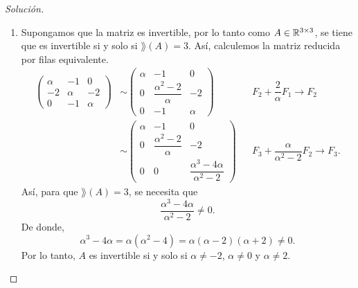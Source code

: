 \documentclass[a4,11pt]{aleph-notas}
\begin{document}
\begin{proof}[Solución]\hspace{0pt}
    \begin{enumerate}
        \item Supongamos que la matriz es invertible, por lo tanto como $A\in\mathbb{R}^{3\times 3}$, se tiene que es invertible si y solo si $\rang(A)=3$. Así, calculemos la matriz reducida por filas equivalente.
        \begin{align*}
            \begin{pmatrix}
                \alpha & -1 & 0 \\
                -2 & \alpha & -2 \\
                0 & -1 & \alpha
            \end{pmatrix}
         & \sim \begin{pmatrix}
                \alpha & -1 & 0 \\
                0 & \dfrac{\alpha^2-2}{\alpha} & -2 \\
                0 & -1 & \alpha 
            \end{pmatrix} && F_2 + \dfrac{2}{\alpha} F_1 \rightarrow F_2 \\
        &\sim \begin{pmatrix}
                \alpha & -1 & 0 \\
                0 & \dfrac{\alpha^2-2}{\alpha} & -2 \\
                0 & 0 & \dfrac{\alpha^3-4\alpha}{\alpha^2-2}
            \end{pmatrix} && F_3 + \dfrac{\alpha}{\alpha^2-2} F_2 \rightarrow F_3.
        \end{align*}
        Así, para que $\rang(A)=3$, se necesita que 
        \[
            \dfrac{\alpha^3-4\alpha}{\alpha^2-2} \neq 0.
        \]
        De donde, 
        \[
            \alpha^3-4\alpha = \alpha ( \alpha^2-4) = \alpha (\alpha-2)(\alpha+2)\neq 0.
        \]
        Por lo tanto, $A$ es invertible si y solo si $\alpha \neq-2$, $\alpha\neq0$ y $\alpha\neq2$.

\end{enumerate}
\end{proof}
\end{document}
